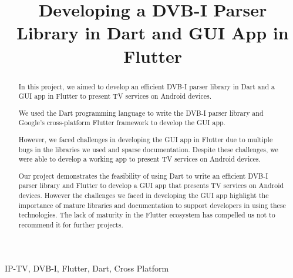 \documentclass[conference]{IEEEtran}
\begin{document}
\title{Developing a DVB-I Parser Library in Dart and GUI App in Flutter\\}

\author{
\and
{}
\and
{}
\and

}

\maketitle

\begin{abstract}
 In this project, we aimed to develop an efficient DVB-I parser library in Dart and a GUI app in Flutter to present TV services on Android devices.

We used the Dart programming language to write the DVB-I parser library and Google's cross-platform Flutter framework to develop the GUI app.

 However, we faced challenges in developing the GUI app in Flutter due to multiple bugs in the libraries we used and sparse documentation. Despite these challenges, we were able to develop a working app to present TV services on Android devices.

Our project demonstrates the feasibility of using Dart to write an efficient DVB-I parser library and Flutter to develop a GUI app that presents TV services on Android devices. However the challenges we faced in developing the GUI app highlight the importance of mature libraries and documentation to support developers in using these technologies. The lack of maturity in the Flutter ecosystem has compelled us not to recommend it for further projects.
\end{abstract}

\begin{IEEEkeywords}
IP-TV, DVB-I, Flutter, Dart, Cross Platform
\end{IEEEkeywords}
\end{document}
